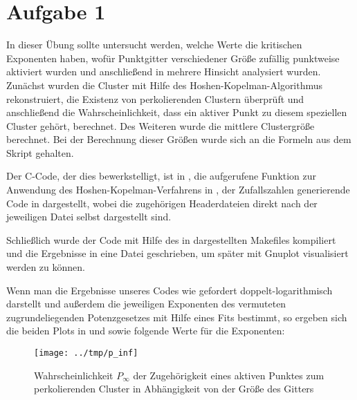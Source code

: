 \section*{Aufgabe 1}
In dieser Übung sollte untersucht werden, welche Werte die kritischen Exponenten
haben, wofür Punktgitter verschiedener Größe zufällig punktweise aktiviert wurden
und anschließend in mehrere Hinsicht analysiert wurden. Zunächst wurden die Cluster
mit Hilfe des Hoshen-Kopelman-Algorithmus rekonstruiert, die Existenz
von perkolierenden Clustern überprüft und anschließend die Wahrscheinlichkeit, dass
ein aktiver Punkt zu diesem speziellen Cluster gehört, berechnet. Des Weiteren
wurde die mittlere Clustergröße berechnet. Bei der Berechnung dieser Größen wurde
sich an die Formeln aus dem Skript gehalten.

Der C-Code, der dies bewerkstelligt, ist in , die aufgerufene
Funktion zur Anwendung des Hoshen-Kopelman-Verfahrens in , der Zufallszahlen
generierende Code in  dargestellt, wobei die zugehörigen Headerdateien 
direkt nach der jeweiligen Datei selbst dargestellt sind.




% 


Schließlich wurde der Code mit Hilfe des in  dargestellten Makefiles
kompiliert und die Ergebnisse in eine Datei geschrieben, um später mit Gnuplot
visualisiert werden zu können.



Wenn man die Ergebnisse unseres Codes wie gefordert doppelt-logarithmisch darstellt
und außerdem die jeweiligen Exponenten des vermuteten zugrundeliegenden Potenzgesetzes
mit Hilfe eines Fits bestimmt, so ergeben sich die beiden Plots in  und
 sowie folgende Werte für die Exponenten:

\begin{figure}[htb]
  \centering
  \texttt{[image: ../tmp/p\_inf]}
  \caption{Wahrscheinlichkeit $P_{\infty}$ der Zugehörigkeit eines aktiven Punktes zum perkolierenden Cluster in Abhängigkeit von der Größe des Gitters}
  \label{fig:P}
\end{figure}


